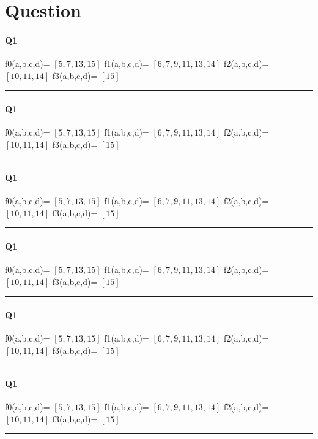 
\section{Question}

\paragraph{Q1}


f0(a,b,c,d)= $[5, 7, 13, 15]$
f1(a,b,c,d)= $[6, 7, 9, 11, 13, 14]$
f2(a,b,c,d)= $[10, 11, 14]$
f3(a,b,c,d)= $[15]$

\hrule width 1\linewidth
\paragraph{Q1}


f0(a,b,c,d)= $[5, 7, 13, 15]$
f1(a,b,c,d)= $[6, 7, 9, 11, 13, 14]$
f2(a,b,c,d)= $[10, 11, 14]$
f3(a,b,c,d)= $[15]$

\hrule width 1\linewidth
\paragraph{Q1}


f0(a,b,c,d)= $[5, 7, 13, 15]$
f1(a,b,c,d)= $[6, 7, 9, 11, 13, 14]$
f2(a,b,c,d)= $[10, 11, 14]$
f3(a,b,c,d)= $[15]$

\hrule width 1\linewidth
\paragraph{Q1}


f0(a,b,c,d)= $[5, 7, 13, 15]$
f1(a,b,c,d)= $[6, 7, 9, 11, 13, 14]$
f2(a,b,c,d)= $[10, 11, 14]$
f3(a,b,c,d)= $[15]$

\hrule width 1\linewidth
\paragraph{Q1}


f0(a,b,c,d)= $[5, 7, 13, 15]$
f1(a,b,c,d)= $[6, 7, 9, 11, 13, 14]$
f2(a,b,c,d)= $[10, 11, 14]$
f3(a,b,c,d)= $[15]$

\hrule width 1\linewidth
\paragraph{Q1}


f0(a,b,c,d)= $[5, 7, 13, 15]$
f1(a,b,c,d)= $[6, 7, 9, 11, 13, 14]$
f2(a,b,c,d)= $[10, 11, 14]$
f3(a,b,c,d)= $[15]$

\hrule width 1\linewidth\pagebreak
